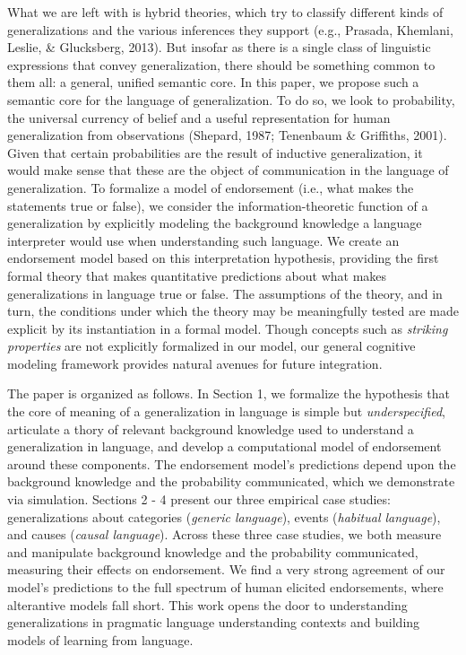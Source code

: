 \documentclass[english,floatsintext,man]{apa6}
\theoremstyle{definition}
\theoremstyle{definition}
\theoremstyle{definition}
\theoremstyle{remark}
\begin{document}
What we are left with is hybrid theories, which try to classify
different kinds of generalizations and the various inferences they
support (e.g., Prasada, Khemlani, Leslie, \& Glucksberg, 2013). But
insofar as there is a single class of linguistic expressions that convey
generalization, there should be something common to them all: a general,
unified semantic core. In this paper, we propose such a semantic core
for the language of generalization. To do so, we look to probability,
the universal currency of belief and a useful representation for human
generalization from observations (Shepard, 1987; Tenenbaum \& Griffiths,
2001). Given that certain probabilities are the result of inductive
generalization, it would make sense that these are the object of
communication in the language of generalization. To formalize a model of
endorsement (i.e., what makes the statements true or false), we consider
the information-theoretic function of a generalization by explicitly
modeling the background knowledge a language interpreter would use when
understanding such language. We create an endorsement model based on
this interpretation hypothesis, providing the first formal theory that
makes quantitative predictions about what makes generalizations in
language true or false. The assumptions of the theory, and in turn, the
conditions under which the theory may be meaningfully tested are made
explicit by its instantiation in a formal model. Though concepts such as
\emph{striking properties} are not explicitly formalized in our model,
our general cognitive modeling framework provides natural avenues for
future integration.

The paper is organized as follows. In Section 1, we formalize the
hypothesis that the core of meaning of a generalization in language is
simple but \emph{underspecified}, articulate a thory of relevant
background knowledge used to understand a generalization in language,
and develop a computational model of endorsement around these
components. The endorsement model's predictions depend upon the
background knowledge and the probability communicated, which we
demonstrate via simulation. Sections 2 - 4 present our three empirical
case studies: generalizations about categories (\emph{generic
language}), events (\emph{habitual language}), and causes (\emph{causal
language}). Across these three case studies, we both measure and
manipulate background knowledge and the probability communicated,
measuring their effects on endorsement. We find a very strong agreement
of our model's predictions to the full spectrum of human elicited
endorsements, where alterantive models fall short. This work opens the
door to understanding generalizations in pragmatic language
understanding contexts and building models of learning from language.
\end{document}
